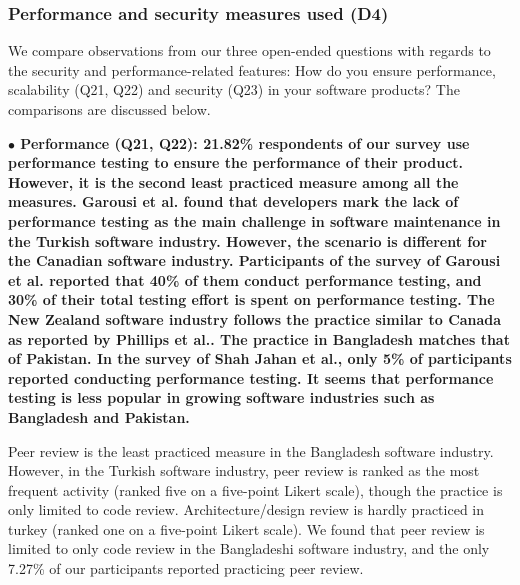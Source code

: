 \subsubsection{Performance and security measures used (D4)}\label{sec:rq2-d4}
% 
We compare observations from our three open-ended questions with regards to the security and performance-related features:
How do you ensure performance, scalability (Q21, Q22) and security (Q23) in your software products? The comparisons are discussed below.





\nd\bf{$\bullet$ Performance (Q21, Q22):} 21.82\% respondents of
our survey use performance testing to ensure the performance of their product.
However, it is
the second least practiced measure among all the measures. Garousi et
al.\citep{Garousi2015} found that developers mark the lack of performance
testing as the main challenge in software maintenance in the Turkish software
industry. However, the scenario is different for the Canadian software industry.
Participants of the survey of Garousi et al.\citep{Garousi2013} reported that
40\% of them conduct performance testing, and 30\% of their total testing effort
is spent on performance testing. The New Zealand software industry follows the
practice similar to Canada as reported by Phillips et al.\citep{Phillips2003}.
The practice in Bangladesh matches that of Pakistan.
In the survey of Shah Jahan et al.\citep{Jahan2019}, only 5\% of participants
reported conducting performance testing. It seems that performance testing is
less popular in growing software industries such as Bangladesh and Pakistan.

Peer review is the least practiced measure in the Bangladesh software industry.
However, in the Turkish software industry, peer review is ranked as the most
frequent activity\citep{Garousi2015} (ranked five on a five-point Likert scale),
though the practice is only limited to code review. Architecture/design review
is hardly practiced in turkey (ranked one on a five-point Likert scale). We
found that peer review is limited to only code review in the Bangladeshi
software industry, and the only 7.27\% of our participants reported practicing
peer review.

